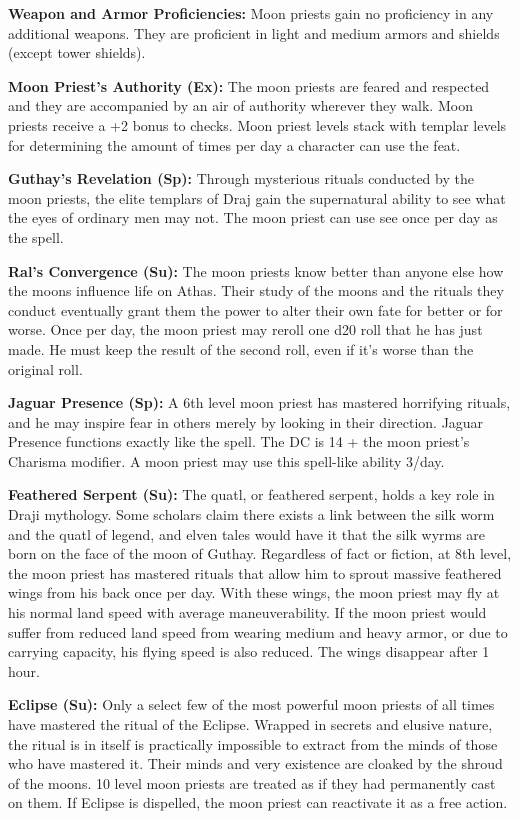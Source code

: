 {
\textbf{Weapon and Armor Proficiencies:} Moon priests gain no proficiency in any additional weapons. They are proficient in light and medium armors and shields (except tower shields).

\textbf{Moon Priest's Authority (Ex):} The moon priests are feared and respected and they are accompanied by an air of authority wherever they walk. Moon priests receive a +2 bonus to  checks. Moon priest levels stack with templar levels for determining the amount of times per day a character can use the  feat.

\textbf{Guthay's Revelation (Sp):} Through mysterious rituals conducted by the moon priests, the elite templars of Draj gain the supernatural ability to see what the eyes of ordinary men may not. The moon priest can use see  once per day as the spell.

\textbf{Ral's Convergence (Su):} The moon priests know better than anyone else how the moons influence life on Athas. Their study of the moons and the rituals they conduct eventually grant them the power to alter their own fate for better or for worse. Once per day, the moon priest may reroll one d20 roll that he has just made. He must keep the result of the second roll, even if it's worse than the original roll.

\textbf{Jaguar Presence (Sp):} A 6th level moon priest has mastered horrifying rituals, and he may inspire fear in others merely by looking in their direction. Jaguar Presence functions exactly like the  spell. The DC is 14 + the moon priest's Charisma modifier. A moon priest may use this spell-like ability 3/day.

\textbf{Feathered Serpent (Su):} The quatl, or feathered serpent, holds a key role in Draji mythology. Some scholars claim there exists a link between the silk worm and the quatl of legend, and elven tales would have it that the silk wyrms are born on the face of the moon of Guthay. Regardless of fact or fiction, at 8th level, the moon priest has mastered rituals that allow him to sprout massive feathered wings from his back once per day. With these wings, the moon priest may fly at his normal land speed with average maneuverability. If the moon priest would suffer from reduced land speed from wearing medium and heavy armor, or due to carrying capacity, his flying speed is also reduced. The wings disappear after 1 hour.

\textbf{Eclipse (Su):} Only a select few of the most powerful moon priests of all times have mastered the ritual of the Eclipse. Wrapped in secrets and elusive nature, the ritual is in itself is practically impossible to extract from the minds of those who have mastered it. Their minds and very existence are cloaked by the shroud of the moons. 10 level moon priests are treated as if they
had  permanently cast on them. If Eclipse is dispelled, the moon priest can reactivate it as a free action.

}
